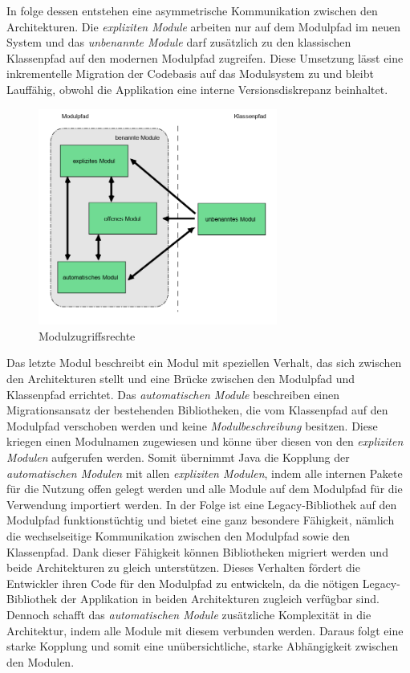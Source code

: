     In folge dessen entstehen eine asymmetrische Kommunikation zwischen den Architekturen. Die \textit{expliziten Module} arbeiten nur auf dem Modulpfad im neuen System und das \textit{unbenannte Module} darf zusätzlich zu den klassischen Klassenpfad auf den modernen Modulpfad zugreifen. Diese Umsetzung lässt eine inkrementelle Migration der Codebasis auf das Modulsystem zu und bleibt Lauffähig, obwohl die Applikation eine interne Versionsdiskrepanz beinhaltet.

    \begin{figure}[h]
      \centering
      \includegraphics[width=0.7\textwidth]{material/images/module-access.png}
      \caption{Modulzugriffsrechte}
      \label{fig:modacc}
    \end{figure}

    Das letzte Modul beschreibt ein Modul mit speziellen Verhalt, das sich zwischen den Architekturen stellt und eine Brücke zwischen den Modulpfad und Klassenpfad errichtet. Das \textit{automatischen Module} beschreiben einen Migrationsansatz der bestehenden Bibliotheken, die vom Klassenpfad auf den Modulpfad verschoben werden und keine \textit{Modulbeschreibung} besitzen. Diese kriegen einen Modulnamen zugewiesen und könne über diesen von den \textit{expliziten Modulen} aufgerufen werden. Somit übernimmt Java die Kopplung der \textit{automatischen Modulen} mit allen \textit{expliziten Modulen}, indem alle internen Pakete für die Nutzung offen gelegt werden und alle Module auf dem Modulpfad für die Verwendung importiert werden. In der Folge ist eine Legacy-Bibliothek auf den Modulpfad funktionstüchtig und bietet eine ganz besondere Fähigkeit, nämlich die wechselseitige Kommunikation zwischen den Modulpfad sowie den Klassenpfad. Dank dieser Fähigkeit können Bibliotheken migriert werden und beide Architekturen zu gleich unterstützen. Dieses Verhalten fördert die Entwickler ihren Code für den Modulpfad zu entwickeln, da die nötigen Legacy-Bibliothek der Applikation in beiden Architekturen zugleich verfügbar sind. Dennoch schafft das \textit{automatischen Module} zusätzliche Komplexität in die Architektur, indem alle Module mit diesem verbunden werden. Daraus folgt eine starke Kopplung und somit eine unübersichtliche, starke Abhängigkeit zwischen den Modulen.\bigbreak

